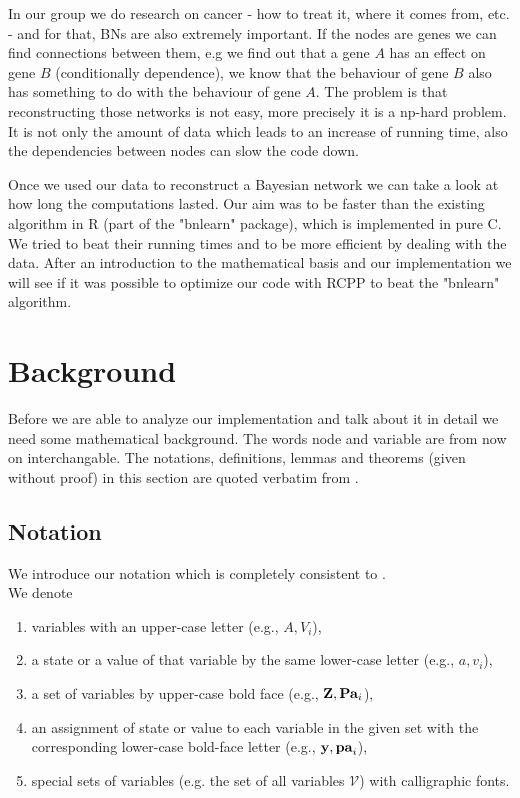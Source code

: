 In our group we do research on cancer - how to treat it, where it comes from, etc. - and for that, BNs are also extremely important. If the nodes are genes we can find connections between them, e.g we find out that a gene $A$ has an effect on gene $B$ (conditionally dependence), we know that the behaviour of gene $B$ also has something to do with the behaviour of gene $A$. The problem is that reconstructing those networks is not easy, more precisely it is a np-hard problem. It is not only the amount of data which leads to an increase of running time, also the dependencies between nodes can slow the code down.

Once we used our data to reconstruct a Bayesian network we can take a look at how long the computations lasted. Our aim was to be faster than the existing algorithm in R (part of the "bnlearn" package), which is implemented in pure C. We tried to beat their running times and to be more efficient by dealing with the data. After an introduction to the mathematical basis and our implementation we will see if it was possible to optimize our code with RCPP to beat the "bnlearn" algorithm.

\chapter{Background}

	Before we are able to analyze our implementation and talk about it in detail we need some mathematical background. The words node and variable are from now on interchangable. The notations, definitions, lemmas and theorems (given without proof) in this section are quoted verbatim from \cite{TBA}.

	\section*{Notation}

		We introduce our notation which is completely consistent to \cite{TBA}.\\
		We denote
		\begin{enumerate}
			\item variables with an upper-case letter (e.g., $A, V_{i}$),
			\item a state or a value of that variable by the same lower-case letter (e.g., $a, v_{i}$),
			\item a set of variables by upper-case bold face (e.g., ${\textbf{Z}}, {\textbf{Pa}}_{i}$),
			\item an assignment of state or value to each variable in the given set with the corresponding lower-case bold-face letter (e.g., ${\textbf{y}}, {\textbf{pa}}_{i}$),
			\item special sets of variables (e.g. the set of all variables $\mathcal{V}$) with calligraphic fonts.
		\end{enumerate}

